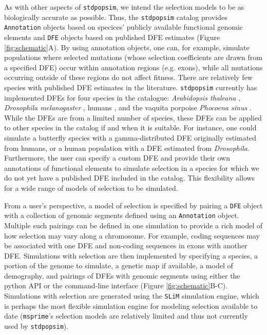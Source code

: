 \documentclass[hidelinks]{article}
\newcommand{\stdpopsim}{\texttt{stdpopsim}\xspace}
\newcommand{\slim}{\texttt{SLiM}\xspace}
\newcommand{\msprime}{\texttt{msprime}\xspace}
\begin{document}
    As with other aspects of \stdpopsim, we intend the selection models to be as biologically accurate as possible.
    Thus, the \stdpopsim catalog provides \texttt{Annotation} objects based on specices' publicly available functional genomic elements 
    and \texttt{DFE} objects based on published DFE estimates (Figure \ref{fig:schematic}A).
    By using annotation objects, one can, for example, simulate populations where selected mutations (whose selection
    coefficients are drawn from a specified DFE) occur within annotation regions (e.g. exons), while all mutations
    occurring outside of these regions do not affect fitness.
    There are relatively few species with published DFE estimates in the literature.
    \stdpopsim currently has implemented DFEs for four species in the catalogue:
    \textit{Arabidopsis thaleana} \citep{huber2018gene}, \textit{Drosophila melanogaster} \citep{ragsdale2016triallelic,huber2017determining},
    humans \citep{huber2017determining,kim2017inference}, and the vaquita porpoise \textit{Phocoena sinus} \citep{robinson2022critically}.
    While the DFEs are from a limited number of species, these DFEs can be applied to other species
    in the catalog if and when it is suitable. 
    For instance, one could simulate a butterfly species with a gamma-distributed DFE originally
    estimated from humans, or a human population with a DFE estimated from \textit{Drosophila}.
    Furthermore, the user can specify a custom DFE and provide their own annotations
    of functional elements to simulate selection in a species for which we do not yet have 
    a published DFE included in the catalog. This flexibility allows for a wide range of
    models of selection to be simulated. 
  
    From a user's perspective, a model of selection is specified by pairing a \texttt{DFE} object
    with a collection of genomic segments defined using an \texttt{Annotation} object.
    Multiple such pairings can be defined in one simulation
    to provide a rich model of how selection may vary along a chromosome.
    For example, coding sequences may be associated with one DFE and non-coding sequences in exons with another DFE.
    Simulations with selection are then implemented by specifying a species, 
    a portion of the genome to simulate,
    a genetic map if available, a model of demography, and pairings of DFEs with genomic segments
    using either the python API or the command-line interface (Figure \ref{fig:schematic}B-C).
    Simulations with selection are generated
    using the \slim simulation engine, which is perhaps
    the most flexible simulation engine for modeling selection available to date
    (\msprime's selection models are relatively limited and thus not currently used by \stdpopsim).
\end{document}
